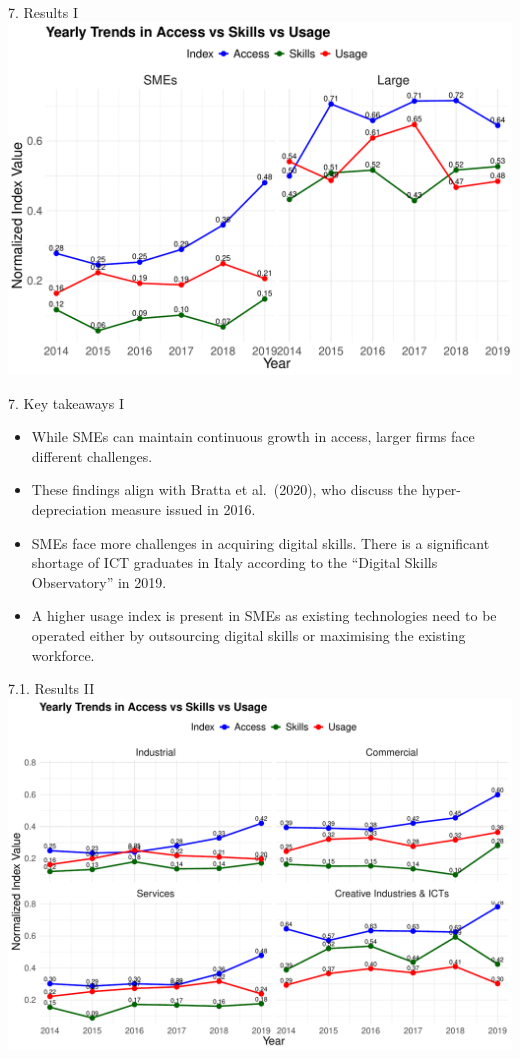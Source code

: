 \documentclass[
  ignorenonframetext,
]{beamer}
\begin{document}
\begin{frame}{7. Results I}
\label{results-i}
\includegraphics{Chapter_3_files/figure-beamer/yearTrendSize-1.pdf}
\end{frame}

\begin{frame}{7. Key takeaways I}
\label{key-takeaways-i}
\begin{itemize}
\item
  While SMEs can maintain continuous growth in access, larger firms face
  different challenges.
\item
  These findings align with Bratta et al.~(2020), who discuss the
  hyper-depreciation measure issued in 2016.
\item
  SMEs face more challenges in acquiring digital skills. There is a
  significant shortage of ICT graduates in Italy according to the
  ``Digital Skills Observatory'' in 2019.
\item
  A higher usage index is present in SMEs as existing technologies need
  to be operated either by outsourcing digital skills or maximising the
  existing workforce.
\end{itemize}
\end{frame}

\begin{frame}{7.1. Results II}
\label{results-ii}
\includegraphics{Chapter_3_files/figure-beamer/yearTrendMac-1.pdf}
\end{frame}
\end{document}
